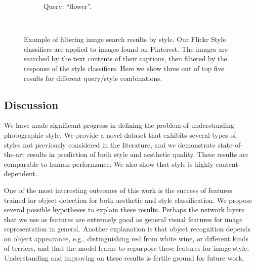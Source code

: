 \begin{figure}
\begin{subfigure}[t]{0.48\linewidth}
\begin{tabular}{m{.05in}|m{\dgap} m{\dgap} m{\dgap}}
    \end{tabular}
    \caption{Query: ``flower''.}
\end{subfigure}
\\
\caption[
Filtering Pinterest image search results by style, predicted by Flickr Style classifiers.
]{
    Example of filtering image search results by style.
    Our Flickr Style classifiers are applied to images found on Pinterest.
    The images are searched by the text contents of their captions, then filtered by the response of the style classifiers.
    Here we show three out of top five results for different query/style combinations.
}\label{fig:flickr_on_pinterest}
\end{figure}

\subsection{Discussion}
We have made significant progress in defining the problem of understanding photographic style.
We provide a novel dataset that exhibits several types of styles not previously considered in the literature, and we demonstrate state-of-the-art results in prediction of both style and aesthetic quality.
These results are comparable to human performance.
We also show that style is highly content-dependent.

One of the most interesting outcomes of this work is the success of features trained for object detection for both aesthetic and style classification.
We propose several possible hypotheses to explain these results.
Perhaps the network layers that we use as features are extremely good as general visual features for image representation in general.
Another explanation is that object recognition depends on object appearance, e.g., distinguishing red from white wine, or different kinds of terriers, and that the model learns to repurpose these features for image style.
Understanding and improving on these results is fertile ground for future work.

